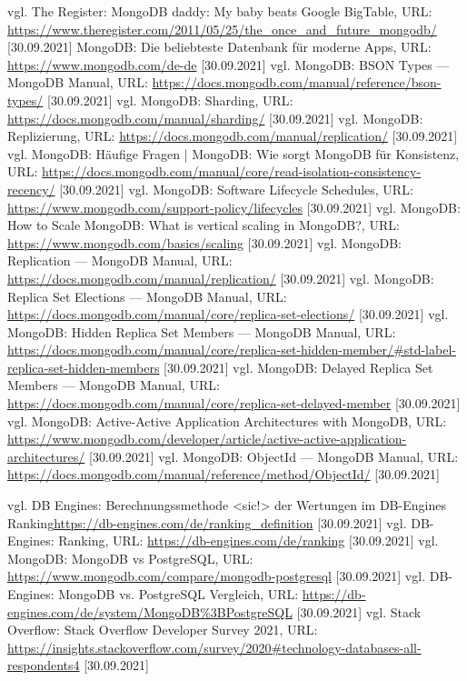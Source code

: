 \begin{thebibliography}{2}
         vgl. The Register: MongoDB daddy: My baby beats Google BigTable, URL: \url{https://www.theregister.com/2011/05/25/the_once_and_future_mongodb/} [30.09.2021]
         MongoDB: Die beliebteste Datenbank für moderne Apps, URL: \url{https://www.mongodb.com/de-de} [30.09.2021]
         vgl. MongoDB: BSON Types — MongoDB Manual, URL: \url{https://docs.mongodb.com/manual/reference/bson-types/} [30.09.2021]
         vgl. MongoDB: Sharding, URL: \url{https://docs.mongodb.com/manual/sharding/} [30.09.2021]
         vgl. MongoDB: Replizierung, URL: \url{https://docs.mongodb.com/manual/replication/} [30.09.2021]
         vgl. MongoDB: Häufige Fragen | MongoDB: Wie sorgt MongoDB für Konsistenz, URL: \url{https://docs.mongodb.com/manual/core/read-isolation-consistency-recency/} [30.09.2021]
         vgl. MongoDB: Software Lifecycle Schedules, URL: \url{https://www.mongodb.com/support-policy/lifecycles} [30.09.2021]
         vgl. MongoDB: How to Scale MongoDB: What is vertical scaling in MongoDB?, URL: \url{https://www.mongodb.com/basics/scaling} [30.09.2021]
         vgl. MongoDB: Replication — MongoDB Manual, URL: \url{https://docs.mongodb.com/manual/replication/} [30.09.2021]
         vgl. MongoDB: Replica Set Elections — MongoDB Manual, URL: \url{https://docs.mongodb.com/manual/core/replica-set-elections/} [30.09.2021]
         vgl. MongoDB: Hidden Replica Set Members — MongoDB Manual, URL: \url{https://docs.mongodb.com/manual/core/replica-set-hidden-member/#std-label-replica-set-hidden-members} [30.09.2021]
         vgl. MongoDB: Delayed Replica Set Members — MongoDB Manual, URL: \url{https://docs.mongodb.com/manual/core/replica-set-delayed-member} [30.09.2021]
         vgl. MongoDB: Active-Active Application Architectures with MongoDB, URL: \url{https://www.mongodb.com/developer/article/active-active-application-architectures/} [30.09.2021]
         vgl. MongoDB: ObjectId — MongoDB Manual, URL: \url{https://docs.mongodb.com/manual/reference/method/ObjectId/} [30.09.2021]

         vgl. DB Engines: Berechnungssmethode <sic!> der Wertungen im DB-Engines Ranking\url{https://db-engines.com/de/ranking_definition} [30.09.2021]
         vgl. DB-Engines: Ranking, URL: \url{https://db-engines.com/de/ranking} [30.09.2021]
         vgl. MongoDB: MongoDB vs PostgreSQL, URL: \url{https://www.mongodb.com/compare/mongodb-postgresql} [30.09.2021]
         vgl. DB-Engines: MongoDB vs. PostgreSQL Vergleich, URL: \url{https://db-engines.com/de/system/MongoDB%3BPostgreSQL} [30.09.2021]
         vgl. Stack Overflow: Stack Overflow Developer Survey 2021, URL: \url{https://insights.stackoverflow.com/survey/2020#technology-databases-all-respondents4} [30.09.2021]
        

\end{thebibliography}
